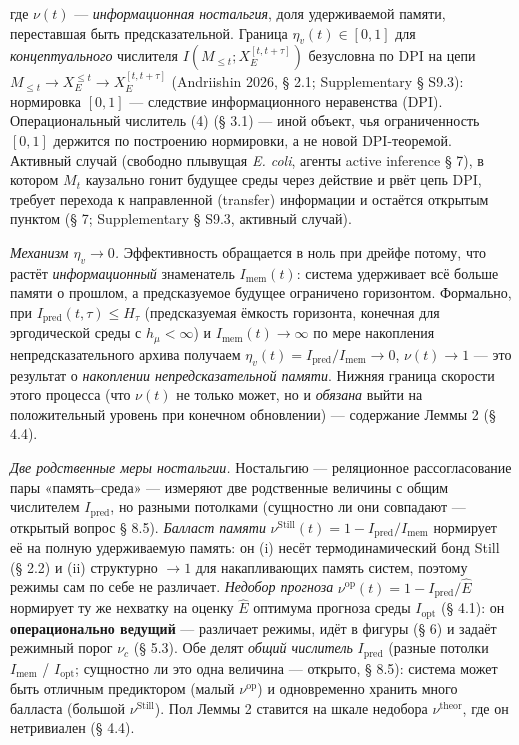 \documentclass[pdflatex,sn-mathphys-ay]{sn-jnl}
\begin{document}
где \(\nu(t)\) --- \emph{информационная ностальгия}, доля удерживаемой памяти, переставшая быть предсказательной. Граница \(\eta_v(t) \in [0,1]\) для \emph{концептуального} числителя \(I(M_{\le t}; X_E^{[t,t+\tau]})\) безусловна по DPI на цепи \(M_{\le t} \to X_E^{\le t} \to X_E^{[t,t+\tau]}\) (Andriishin 2026, § 2.1; Supplementary § S9.3): нормировка \([0,1]\) --- следствие информационного неравенства (DPI). Операциональный числитель (4) (§ 3.1) --- иной объект, чья ограниченность \([0,1]\) держится по построению нормировки, а не новой DPI-теоремой. Активный случай (свободно плывущая \emph{E. coli}, агенты active inference § 7), в котором \(M_t\) каузально гонит будущее среды через действие и рвёт цепь DPI, требует перехода к направленной (transfer) информации и остаётся открытым пунктом (§ 7; Supplementary § S9.3, активный случай).



\emph{Механизм \(\eta_v \to 0\).} Эффективность обращается в ноль при дрейфе потому, что растёт \emph{информационный} знаменатель \(I_{\text{mem}}(t)\): система удерживает всё больше памяти о прошлом, а предсказуемое будущее ограничено горизонтом. Формально, при \(I_{\text{pred}}(t,\tau) \le H_\tau\) (предсказуемая ёмкость горизонта, конечная для эргодической среды с \(h_\mu < \infty\)) и \(I_{\text{mem}}(t) \to \infty\) по мере накопления непредсказательного архива получаем \(\eta_v(t) = I_{\text{pred}}/I_{\text{mem}} \to 0\), \(\nu(t) \to 1\) --- это результат о \emph{накоплении непредсказательной памяти}. Нижняя граница скорости этого процесса (что \(\nu(t)\) не только может, но и \emph{обязана} выйти на положительный уровень при конечном обновлении) --- содержание Леммы 2 (§ 4.4).



\emph{Две родственные меры ностальгии.} Ностальгию --- реляционное рассогласование пары «память--среда» --- измеряют две родственные величины с общим числителем \(I_{\text{pred}}\), но разными потолками (сущностно ли они совпадают --- открытый вопрос § 8.5). \emph{Балласт памяти} \(\nu^{\text{Still}}(t) = 1 - I_{\text{pred}}/I_{\text{mem}}\) нормирует её на полную удерживаемую память: он (i) несёт термодинамический бонд Still (§ 2.2) и (ii) структурно \(\to 1\) для накапливающих память систем, поэтому режимы сам по себе не различает. \emph{Недобор прогноза} \(\nu^{\text{op}}(t) = 1 - I_{\text{pred}}/\hat E\) нормирует ту же нехватку на оценку \(\hat E\) оптимума прогноза среды \(I_{\text{opt}}\) (§ 4.1): он \textbf{операционально ведущий} --- различает режимы, идёт в фигуры (§ 6) и задаёт режимный порог \(\nu_c\) (§ 5.3). Обе делят \emph{общий числитель} \(I_{\text{pred}}\) (разные потолки \(I_{\text{mem}}\) / \(I_{\text{opt}}\); сущностно ли это одна величина --- открыто, § 8.5): система может быть отличным предиктором (малый \(\nu^{\text{op}}\)) и одновременно хранить много балласта (большой \(\nu^{\text{Still}}\)). Пол Леммы 2 ставится на шкале недобора \(\nu^{\text{theor}}\), где он нетривиален (§ 4.4).
\end{document}
